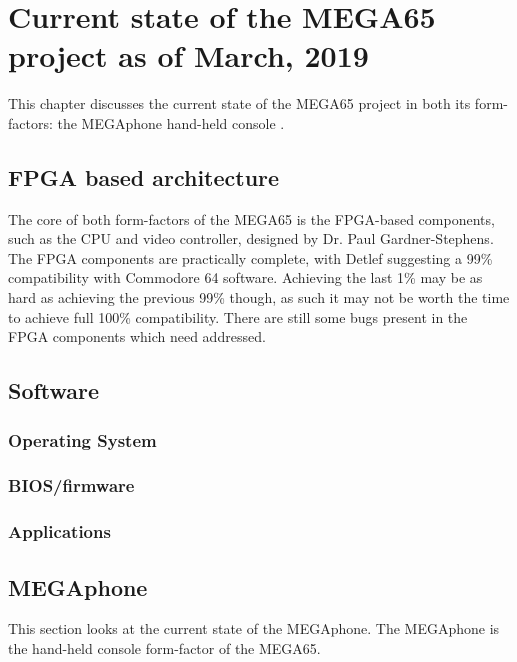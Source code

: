 
\chapter{Current state of the MEGA65 project as of March, 2019}
\label{cha: Chapter5}
This chapter discusses the current state of the MEGA65 project in both its form-factors: the MEGAphone hand-held console . 
\section{FPGA based architecture}
The core of both form-factors of the MEGA65 is the FPGA-based components, such as the CPU and video controller, designed by Dr. Paul Gardner-Stephens. The FPGA components are practically complete, with Detlef suggesting a 99\% compatibility with Commodore 64 software. Achieving the last 1\% may be as hard as achieving the previous 99\% though, as such it may not be worth the time to achieve full 100\% compatibility. There are still some bugs present in the FPGA components which need addressed.

\section{Software}

\subsection{Operating System}

\subsection{BIOS/firmware}

\subsection{Applications}



\section{MEGAphone}
This section looks at the current state of the MEGAphone. The MEGAphone is the hand-held console form-factor of the MEGA65. 

